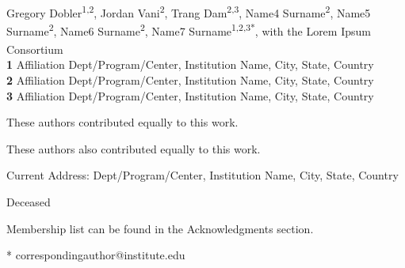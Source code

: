\documentclass[10pt,letterpaper]{article}
\date{}
\begin{document}
\vspace*{0.2in}

\begin{flushleft}
{\Large
\textbf{} %
}
\newline
\\
Gregory Dobler\textsuperscript{1,2\Yinyang},
Jordan Vani\textsuperscript{2\Yinyang},
Trang Dam\textsuperscript{2,3\textcurrency},
Name4 Surname\textsuperscript{2},
Name5 Surname\textsuperscript{2\ddag},
Name6 Surname\textsuperscript{2\ddag},
Name7 Surname\textsuperscript{1,2,3*},
with the Lorem Ipsum Consortium\textsuperscript{\textpilcrow}
\\
\bigskip
\textbf{1} Affiliation Dept/Program/Center, Institution Name, City, State, Country
\\
\textbf{2} Affiliation Dept/Program/Center, Institution Name, City, State, Country
\\
\textbf{3} Affiliation Dept/Program/Center, Institution Name, City, State, Country
\\
\bigskip

%
\Yinyang These authors contributed equally to this work.

\ddag These authors also contributed equally to this work.

\textcurrency Current Address: Dept/Program/Center, Institution Name, City, State, Country %

\dag Deceased

\textpilcrow Membership list can be found in the Acknowledgments section.

* correspondingauthor@institute.edu

\end{flushleft}
\end{document}
